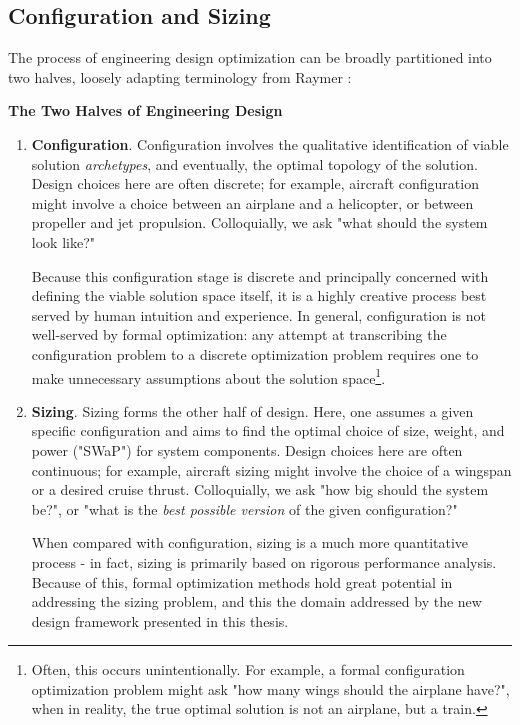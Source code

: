 \subsection{Configuration and Sizing}

The process of engineering design optimization can be broadly partitioned into two halves, loosely adapting terminology from Raymer \cite{raymer}:

\begin{example}
    \textbf{The Two Halves of Engineering Design}
    \begin{enumerate}
        \item \textbf{Configuration}. Configuration involves the qualitative identification of viable solution \textit{archetypes}, and eventually, the optimal topology of the solution. Design choices here are often discrete; for example, aircraft configuration might involve a choice between an airplane and a helicopter, or between propeller and jet propulsion. Colloquially, we ask "what should the system look like?"

        Because this configuration stage is discrete and principally concerned with defining the viable solution space itself, it is a highly creative process best served by human intuition and experience. In general, configuration is not well-served by formal optimization: any attempt at transcribing the configuration problem to a discrete optimization problem requires one to make unnecessary assumptions about the solution space\footnote{Often, this occurs unintentionally. For example, a formal configuration optimization problem might ask "how many wings should the airplane have?", when in reality, the true optimal solution is not an airplane, but a train.}.

        \item \textbf{Sizing}. Sizing forms the other half of design. Here, one assumes a given specific configuration and aims to find the optimal choice of size, weight, and power ("SWaP") for system components. Design choices here are often continuous; for example, aircraft sizing might involve the choice of a wingspan or a desired cruise thrust. Colloquially, we ask "how big should the system be?", or "what is the \textit{best possible version} of the given configuration?"

        When compared with configuration, sizing is a much more quantitative process - in fact, sizing is primarily based on rigorous performance analysis. Because of this, formal optimization methods hold great potential in addressing the sizing problem, and this the domain addressed by the new design framework presented in this thesis.

    \end{enumerate}
\end{example}

